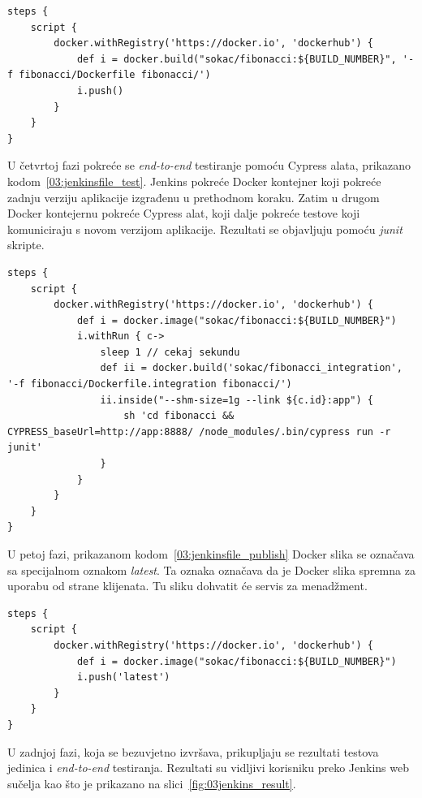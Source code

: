 \begin{lstlisting}[float=h]
steps {
    script {
        docker.withRegistry('https://docker.io', 'dockerhub') {
            def i = docker.build("sokac/fibonacci:${BUILD_NUMBER}", '-f fibonacci/Dockerfile fibonacci/')
            i.push()
        }
    }
}
\end{lstlisting}

U četvrtoj fazi pokreće se \textit{end-to-end} testiranje pomoću Cypress alata, prikazano
kodom~\ref{03:jenkinsfile_test}. Jenkins pokreće Docker kontejner koji pokreće zadnju verziju
aplikacije izgrađenu u prethodnom koraku. Zatim u drugom Docker kontejernu pokreće Cypress alat,
koji dalje pokreće testove koji komuniciraju s novom verzijom aplikacije. Rezultati se objavljuju
pomoću \textit{junit} skripte.

\begin{lstlisting}[float=h]
steps {
    script {
        docker.withRegistry('https://docker.io', 'dockerhub') {
            def i = docker.image("sokac/fibonacci:${BUILD_NUMBER}")
            i.withRun { c->
                sleep 1 // cekaj sekundu
                def ii = docker.build('sokac/fibonacci_integration', '-f fibonacci/Dockerfile.integration fibonacci/')
                ii.inside("--shm-size=1g --link ${c.id}:app") {
                    sh 'cd fibonacci && CYPRESS_baseUrl=http://app:8888/ /node_modules/.bin/cypress run -r junit'
                }
            }
        }
    }
}
\end{lstlisting}

U petoj fazi, prikazanom kodom~\ref{03:jenkinsfile_publish} Docker slika se označava sa specijalnom
oznakom \textit{latest}. Ta oznaka označava da je Docker slika spremna za uporabu od strane
klijenata. Tu sliku dohvatit će servis za menadžment.

\begin{lstlisting}[float=h]
steps {
    script {
        docker.withRegistry('https://docker.io', 'dockerhub') {
            def i = docker.image("sokac/fibonacci:${BUILD_NUMBER}")
            i.push('latest')
        }
    }
}
\end{lstlisting}

U zadnjoj fazi, koja se bezuvjetno izvršava, prikupljaju se rezultati testova jedinica i
\textit{end-to-end} testiranja. Rezultati su vidljivi korisniku preko Jenkins web sučelja kao što je
prikazano na slici~\ref{fig:03jenkins_result}.

